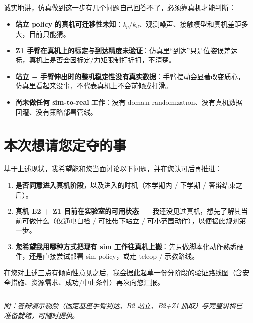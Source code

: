 \documentclass[11pt,a4paper]{ctexart}
\begin{document}
诚实地讲，仿真做到这一步有几个问题自己回答不了，必须靠真机才能判断：

\begin{itemize}
  \item \textbf{站立 policy 的真机可迁移性未知}：$k_p/k_d$、观测噪声、接触模型和真机差距多大，目前只能猜。
  \item \textbf{Z1 手臂在真机上的标定与到达精度未验证}：仿真里“到达”只是位姿误差达标，真机上是否会因标定/力矩限制打折扣，不清楚。
  \item \textbf{站立 + 手臂伸出时的整机稳定性没有真实数据}：手臂摆动会显著改变质心，仿真里看起来没事，不代表真机上不会前倾或打滑。
  \item \textbf{尚未做任何 sim-to-real 工作}：没有 domain randomization、没有真机数据回灌、没有策略部署管线。
\end{itemize}

\section{本次想请您定夺的事}

基于上述现状，我希望能和您当面讨论以下问题，并在您认可后再推进：

\begin{enumerate}
  \item \textbf{是否同意进入真机阶段}，以及进入的时机（本学期内 / 下学期 / 答辩结束之后）。
  \item \textbf{真机 B2 + Z1 目前在实验室的可用状态}——我还没见过真机，想先了解其当前可做什么（仅通电自检 / 可挂带下站立 / 可小范围动作），以便据此规划第一步。
  \item \textbf{您希望我用哪种方式把现有 sim 工作往真机上搬}：先只做脚本化动作熟悉硬件，还是直接尝试部署 sim policy，或走 teleop / 示教路线。
\end{enumerate}

在您对上述三点有倾向性意见之后，我会据此起草一份分阶段的验证路线图（含安全措施、资源需求、成功/中止条件）再次向您汇报。

\vspace{0.6em}
\hrule
\vspace{0.4em}
\small\textit{附：答辩演示视频（固定基座手臂到达、B2 站立、B2+Z1 抓取）与完整讲稿已准备就绪，可随时提供。}
\end{document}

